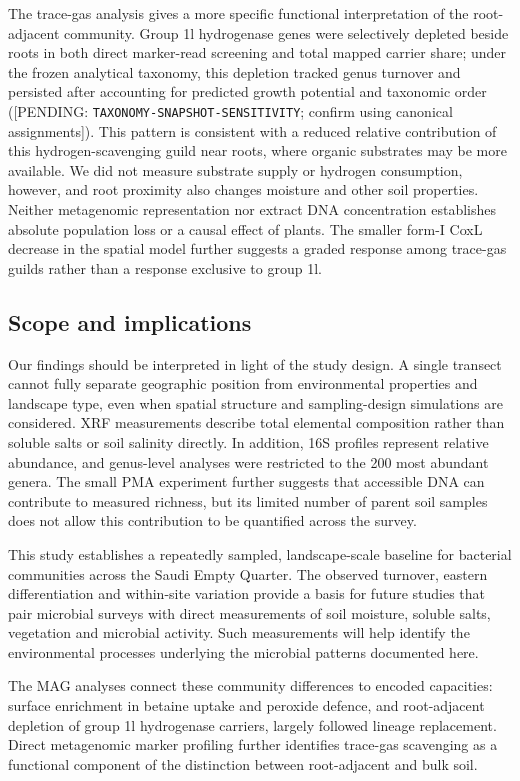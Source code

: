 \documentclass[fleqn,10pt,numbers]{olplainarticle}
\begin{document}
The trace-gas analysis gives a more specific functional interpretation of the root-adjacent community. Group 1l hydrogenase genes were selectively depleted beside roots in both direct marker-read screening and total mapped carrier share; under the frozen analytical taxonomy, this depletion tracked genus turnover and persisted after accounting for predicted growth potential and taxonomic order ([PENDING: \texttt{TAXONOMY-\allowbreak SNAPSHOT-\allowbreak SENSITIVITY}; confirm using canonical assignments]). This pattern is consistent with a reduced relative contribution of this hydrogen-scavenging guild near roots, where organic substrates may be more available. We did not measure substrate supply or hydrogen consumption, however, and root proximity also changes moisture and other soil properties. Neither metagenomic representation nor extract DNA concentration establishes absolute population loss or a causal effect of plants. The smaller form-I CoxL decrease in the spatial model further suggests a graded response among trace-gas guilds rather than a response exclusive to group 1l.

\subsection*{Scope and implications}
Our findings should be interpreted in light of the study design. A single transect cannot fully separate geographic position from environmental properties and landscape type, even when spatial structure and sampling-design simulations are considered. XRF measurements describe total elemental composition rather than soluble salts or soil salinity directly. In addition, 16S profiles represent relative abundance, and genus-level analyses were restricted to the 200 most abundant genera. The small PMA experiment further suggests that accessible DNA can contribute to measured richness, but its limited number of parent soil samples does not allow this contribution to be quantified across the survey.

This study establishes a repeatedly sampled, landscape-scale baseline for bacterial communities across the Saudi Empty Quarter. The observed turnover, eastern differentiation and within-site variation provide a basis for future studies that pair microbial surveys with direct measurements of soil moisture, soluble salts, vegetation and microbial activity. Such measurements will help identify the environmental processes underlying the microbial patterns documented here.

The MAG analyses connect these community differences to encoded capacities: surface enrichment in betaine uptake and peroxide defence, and root-adjacent depletion of group 1l hydrogenase carriers, largely followed lineage replacement. Direct metagenomic marker profiling further identifies trace-gas scavenging as a functional component of the distinction between root-adjacent and bulk soil.
\end{document}
